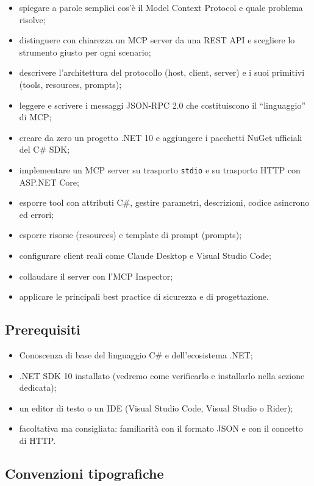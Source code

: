 \documentclass[
  italian,
  10pt,
]{book}
\providecommand{\tightlist}{%
  \setlength{\itemsep}{0pt}\setlength{\parskip}{0pt}}
\begin{document}
\begin{itemize}
\tightlist
\item
  spiegare a parole semplici cos'è il Model Context Protocol e quale
  problema risolve;
\item
  distinguere con chiarezza un MCP server da una REST API e scegliere lo
  strumento giusto per ogni scenario;
\item
  descrivere l'architettura del protocollo (host, client, server) e i
  suoi primitivi (tools, resources, prompts);
\item
  leggere e scrivere i messaggi JSON-RPC 2.0 che costituiscono il
  ``linguaggio'' di MCP;
\item
  creare da zero un progetto .NET 10 e aggiungere i pacchetti NuGet
  ufficiali del C\# SDK;
\item
  implementare un MCP server su trasporto \texttt{stdio} e su trasporto
  HTTP con ASP.NET Core;
\item
  esporre tool con attributi C\#, gestire parametri, descrizioni, codice
  asincrono ed errori;
\item
  esporre risorse (resources) e template di prompt (prompts);
\item
  configurare client reali come Claude Desktop e Visual Studio Code;
\item
  collaudare il server con l'MCP Inspector;
\item
  applicare le principali best practice di sicurezza e di progettazione.
\end{itemize}

\subsection{Prerequisiti}\label{prerequisiti}

\begin{itemize}
\tightlist
\item
  Conoscenza di base del linguaggio C\# e dell'ecosistema .NET;
\item
  .NET SDK 10 installato (vedremo come verificarlo e installarlo nella
  sezione dedicata);
\item
  un editor di testo o un IDE (Visual Studio Code, Visual Studio o
  Rider);
\item
  facoltativa ma consigliata: familiarità con il formato JSON e con il
  concetto di HTTP.
\end{itemize}

\subsection{Convenzioni tipografiche}\label{convenzioni-tipografiche}
\end{document}
